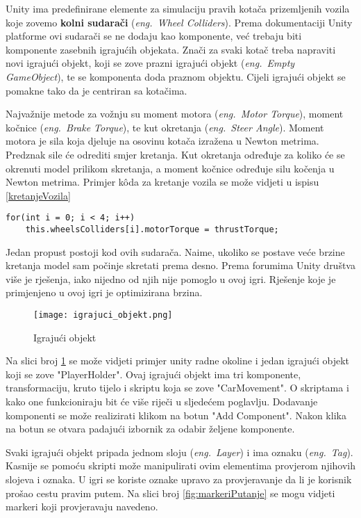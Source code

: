 Unity ima predefinirane elemente za simulaciju pravih kotača prizemljenih vozila koje zovemo \textbf{kolni sudarači} (\emph{eng.~Wheel Colliders}). Prema dokumentaciji Unity platforme ovi sudarači se ne dodaju kao komponente, već trebaju biti komponente zasebnih igrajućih objekata. Znači za svaki kotač treba napraviti novi igrajući objekt, koji se zove prazni igrajući objekt (\emph{eng.~Empty GameObject}), te se komponenta doda praznom objektu. Cijeli igrajući objekt se pomakne tako da je centriran sa kotačima.

Najvažnije metode za vožnju su moment motora (\emph{eng.~Motor Torque}), moment kočnice (\emph{eng.~Brake Torque}), te kut okretanja (\emph{eng.~Steer Angle}). Moment motora je sila koja djeluje na osovinu kotača izražena u Newton metrima. Predznak sile će odrediti smjer kretanja. Kut okretanja određuje za koliko će se okrenuti model prilikom skretanja, a moment kočnice određuje silu kočenja u Newton metrima. Primjer k\^oda za kretanje vozila se može vidjeti u ispisu \ref{kretanjeVozila}

\begin{lstlisting}[caption={Skripta za kretanje vozila}, label=kretanjeVozila]
for(int i = 0; i < 4; i++)
    this.wheelsColliders[i].motorTorque = thrustTorque;
\end{lstlisting}

Jedan propust postoji kod ovih sudarača. Naime, ukoliko se postave veće brzine kretanja model sam počinje skretati prema desno. Prema forumima Unity društva više je rješenja, iako nijedno od njih nije pomoglo u ovoj igri. Rješenje koje je primjenjeno u ovoj igri je optimizirana brzina.

\begin{figure}[h]
	\texttt{[image: igrajuci\_objekt.png]}
	\centering
	\caption{Igrajući objekt}
	\label{fig:igrajuciobjekt}
\end{figure}
\newpage
Na slici broj \ref{fig:igrajuciobjekt} se može vidjeti primjer unity radne okoline i jedan igrajući objekt koji se zove "PlayerHolder". Ovaj igrajući objekt ima tri komponente, transformaciju, kruto tijelo i skriptu koja se zove "CarMovement". O skriptama i kako one funkcioniraju bit će više riječi u sljedećem poglavlju. Dodavanje komponenti se može realizirati klikom na botun "Add Component". Nakon klika na botun se otvara padajući izbornik za odabir željene komponente.

Svaki igrajući objekt pripada jednom sloju (\emph{eng.~Layer}) i ima oznaku (\emph{eng.~Tag}). Kasnije se pomoću skripti može manipulirati ovim elementima provjerom njihovih slojeva i oznaka. U igri se koriste oznake upravo za provjeravanje da li je korisnik prošao cestu pravim putem. Na slici broj \ref{fig:markeriPutanje} se mogu vidjeti markeri koji provjeravaju navedeno.

